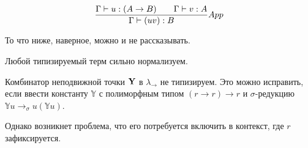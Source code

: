 \[
\frac{\Gamma \vdash u : (A \to B) \hspace{0.7cm} \Gamma \vdash v : A}{\Gamma \vdash (uv):B} App
\]


То что ниже, наверное, можно и не рассказывать.

\begin{theorem}[О нормализуемости]
Любой типизируемый терм сильно нормализуем.
\end{theorem}

\begin{corollary}
Комбинатор неподвижной точки $\mathbf{Y}$ в $\lambda_{\to}$ не типизируем. Это можно исправить, если ввести константу $\mathbb{Y}$ с полиморфным типом $(r \to r) \to r$ и $\sigma$-редукцию $\mathbb{Y} u \to_\sigma u(\mathbb{Y} u)$.

Однако возникнет проблема, что его потребуется включить в контекст, где $r$ зафиксируется. 
\end{corollary}


